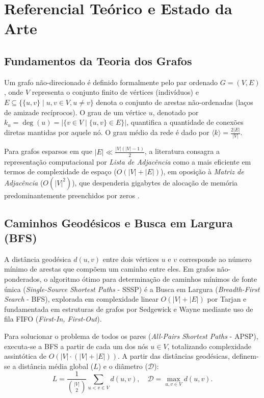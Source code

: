 \documentclass[conference]{IEEEtran}
\begin{document}
\section{Referencial Teórico e Estado da Arte}
\label{sec:referencial}

\subsection{Fundamentos da Teoria dos Grafos}
Um grafo não-direcionado é definido formalmente pelo par ordenado $G = (V, E)$, onde $V$ representa o conjunto finito de vértices (indivíduos) e $E \subseteq \{\{u, v\} \mid u, v \in V, u \neq v\}$ denota o conjunto de arestas não-ordenadas (laços de amizade recíprocos). O grau de um vértice $u$, denotado por $k_u = \deg(u) = |\{v \in V \mid \{u, v\} \in E\}|$, quantifica a quantidade de conexões diretas mantidas por aquele nó. O grau médio da rede é dado por $\langle k \rangle = \frac{2|E|}{|V|}$.

Para grafos esparsos em que $|E| \ll \frac{|V|(|V|-1)}{2}$, a literatura consagra a representação computacional por \textit{Lista de Adjacência} como a mais eficiente em termos de complexidade de espaço ($O(|V| + |E|)$), em oposição à \textit{Matriz de Adjacência} ($O(|V|^2)$), que despenderia gigabytes de alocação de memória predominantemente preenchidos por zeros \cite{sedgewick2011algorithms}.

\subsection{Caminhos Geodésicos e Busca em Largura (BFS)}
A distância geodésica $d(u, v)$ entre dois vértices $u$ e $v$ corresponde ao número mínimo de arestas que compõem um caminho entre eles. Em grafos não-ponderados, o algoritmo ótimo para determinação de caminhos mínimos de fonte única (\textit{Single-Source Shortest Paths} - SSSP) é a Busca em Largura (\textit{Breadth-First Search} - BFS), explorada em complexidade linear $O(|V| + |E|)$ por Tarjan \cite{tarjan1972depth} e fundamentada em estruturas de grafos por Sedgewick e Wayne \cite{sedgewick2011algorithms} mediante uso de fila FIFO (\textit{First-In, First-Out}).

Para solucionar o problema de todos os pares (\textit{All-Pairs Shortest Paths} - APSP), executa-se a BFS a partir de cada um dos nós $u \in V$, totalizando complexidade assintótica de $O(|V| \cdot (|V| + |E|))$. A partir das distâncias geodésicas, definem-se a distância média global ($L$) e o diâmetro ($\mathcal{D}$):
\begin{equation}
L = \frac{1}{\binom{|V|}{2}} \sum_{u < v \in V} d(u, v), \quad \mathcal{D} = \max_{u, v \in V} d(u, v).
\end{equation}
\end{document}
